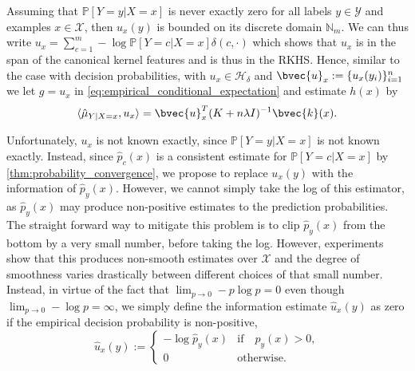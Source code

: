 \documentclass[runningheads, envcountsame, a4paper]{llncs}
\begin{document}
		Assuming that $\mathbb{P}[Y = y | X = x]$ is never exactly zero for all labels $y \in \mathcal{Y}$ and examples $x \in \mathcal{X}$, then $u_{x}(y)$ is bounded on its discrete domain $\mathbb{N}_{m}$. We can thus write $u_{x} = \sum_{c = 1}^{m} - \log{\mathbb{P}[Y = c | X = x]} \delta(c, \cdot)$ which shows that $u_{x}$ is in the span of the canonical kernel features and is thus in the \gls{RKHS}. Hence, similar to the case with decision probabilities, with $u_{x} \in \mathcal{H}_{\delta}$ and $\bvec{u}_{x} := \{u_{x}(y_{i})\}_{i = 1}^{n}$ we let $g = u_{x}$ in \eqref{eq:empirical_conditional_expectation} and estimate $h(x)$ by
		\begin{equation}
			\langle \hat{\mu}_{Y | X = x}, u_{x} \rangle = \bvec{u}_{x}^{T} (K + n \lambda I)^{-1} \bvec{k}(x).
		\end{equation}
		
		Unfortunately, $u_{x}$ is not known exactly, since $\mathbb{P}[Y = y | X = x]$ is not known exactly. Instead, since $\hat{p}_{c}(x)$ is a consistent estimate for $\mathbb{P}[Y = c | X = x]$ by \cref{thm:probability_convergence}, we propose to replace $u_{x}(y)$ with the information of $\hat{p}_{y}(x)$. However, we cannot simply take the log of this estimator, as $\hat{p}_{y}(x)$ may produce non-positive estimates to the prediction probabilities. The straight forward way to mitigate this problem is to clip $\hat{p}_{y}(x)$ from the bottom by a very small number, before taking the log. However, experiments show that this produces non-smooth estimates over $\mathcal{X}$ and the degree of smoothness varies drastically between different choices of that small number. Instead, in virtue of the fact that $\lim_{p \to 0} - p \log{p} = 0$ even though $\lim_{p \to 0} - \log{p} = \infty$, we simply define the information estimate $\hat{u}_{x}(y)$ as zero if the empirical decision probability is non-positive,
		\begin{equation}
			\hat{u}_{x}(y) := \begin{cases}
			- \log{\hat{p}_{y}(x)} & \mathrm{if } \quad \hat{p}_{y}(x) > 0, \\
			0 & \mathrm{otherwise}. \end{cases}
		\label{eq:empirical_information}
		\end{equation}
		
\end{document}
